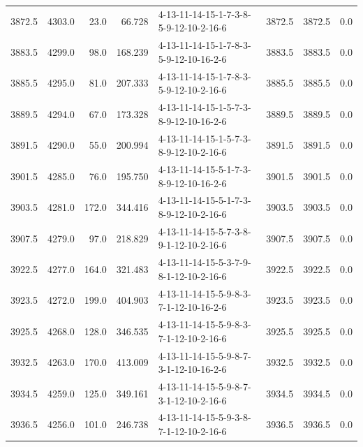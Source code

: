 \begin{tabular}{rrrrlrrr}
 3872.5 &  4303.0 &           23.0 &             66.728 &  4-13-11-14-15-1-7-3-8-5-9-12-10-2-16-6 &        3872.5 &          3872.5 &       0.0 \\
 3883.5 &  4299.0 &           98.0 &            168.239 &  4-13-11-14-15-1-7-8-3-5-9-12-10-16-2-6 &        3883.5 &          3883.5 &       0.0 \\
 3885.5 &  4295.0 &           81.0 &            207.333 &  4-13-11-14-15-1-7-8-3-5-9-12-10-2-16-6 &        3885.5 &          3885.5 &       0.0 \\
 3889.5 &  4294.0 &           67.0 &            173.328 &  4-13-11-14-15-1-5-7-3-8-9-12-10-16-2-6 &        3889.5 &          3889.5 &       0.0 \\
 3891.5 &  4290.0 &           55.0 &            200.994 &  4-13-11-14-15-1-5-7-3-8-9-12-10-2-16-6 &        3891.5 &          3891.5 &       0.0 \\
 3901.5 &  4285.0 &           76.0 &            195.750 &  4-13-11-14-15-5-1-7-3-8-9-12-10-16-2-6 &        3901.5 &          3901.5 &       0.0 \\
 3903.5 &  4281.0 &          172.0 &            344.416 &  4-13-11-14-15-5-1-7-3-8-9-12-10-2-16-6 &        3903.5 &          3903.5 &       0.0 \\
 3907.5 &  4279.0 &           97.0 &            218.829 &  4-13-11-14-15-5-7-3-8-9-1-12-10-2-16-6 &        3907.5 &          3907.5 &       0.0 \\
 3922.5 &  4277.0 &          164.0 &            321.483 &  4-13-11-14-15-5-3-7-9-8-1-12-10-2-16-6 &        3922.5 &          3922.5 &       0.0 \\
 3923.5 &  4272.0 &          199.0 &            404.903 &  4-13-11-14-15-5-9-8-3-7-1-12-10-16-2-6 &        3923.5 &          3923.5 &       0.0 \\
 3925.5 &  4268.0 &          128.0 &            346.535 &  4-13-11-14-15-5-9-8-3-7-1-12-10-2-16-6 &        3925.5 &          3925.5 &       0.0 \\
 3932.5 &  4263.0 &          170.0 &            413.009 &  4-13-11-14-15-5-9-8-7-3-1-12-10-16-2-6 &        3932.5 &          3932.5 &       0.0 \\
 3934.5 &  4259.0 &          125.0 &            349.161 &  4-13-11-14-15-5-9-8-7-3-1-12-10-2-16-6 &        3934.5 &          3934.5 &       0.0 \\
 3936.5 &  4256.0 &          101.0 &            246.738 &  4-13-11-14-15-5-9-3-8-7-1-12-10-2-16-6 &        3936.5 &          3936.5 &       0.0 \\

\end{tabular}
